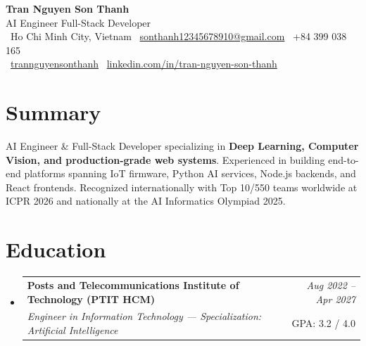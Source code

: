 \documentclass[10pt, a4paper]{article}
\makeatletter
\newcommand{\resumeSubheading}[4]{
  \vspace{3pt}\item
    \begin{tabular*}{1.0\textwidth}[t]{l@{\extracolsep{\fill}}r}
      \textbf{#1} & \textit{\footnotesize #2} \\
      \textit{\footnotesize #3} & \footnotesize #4 \\
    \end{tabular*}\vspace{-5pt}
}
\makeatother
\begin{document}

\begin{center}
    {\Huge \bfseries Tran Nguyen Son Thanh}\\[5pt]
    {\large AI Engineer \textbullet{} Full-Stack Developer}\\[5pt]
    {\small
        \faMapMarker*\ Ho Chi Minh City, Vietnam \quad
        \faEnvelope\ \href{mailto:sonthanh12345678910@gmail.com}{sonthanh12345678910@gmail.com} \quad
        \faPhone\ +84 399 038 165 \\
        \vspace{2pt}
        \faGithub\ \href{https://github.com/trannguyensonthanh}{trannguyensonthanh} \quad
        \faLinkedin\ \href{https://www.linkedin.com/in/tran-nguyen-son-thanh/}{linkedin.com/in/tran-nguyen-son-thanh}
    }
\end{center}
\vspace{-10pt}

\section{Summary}
{\small
AI Engineer \& Full-Stack Developer specializing in \textbf{Deep Learning, Computer Vision, and production-grade web systems}. Experienced in building end-to-end platforms spanning IoT firmware, Python AI services, Node.js backends, and React frontends. Recognized internationally with Top 10/550 teams worldwide at ICPR 2026 and nationally at the AI Informatics Olympiad 2025.
}

\section{Education}
\begin{itemize}[leftmargin=0pt, label={}]
    \resumeSubheading
      {Posts and Telecommunications Institute of Technology (PTIT HCM)}{Aug 2022 -- Apr 2027}
      {Engineer in Information Technology --- Specialization: Artificial Intelligence}{GPA: 3.2 / 4.0}
\end{itemize}

\end{document}

